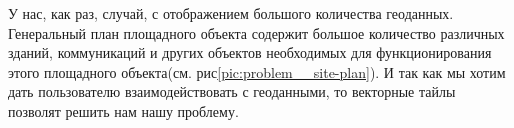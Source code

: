 \vskip 2mm
У нас, как раз, случай, с отображением большого количества геоданных.
Генеральный план площадного объекта содержит большое количество различных зданий, коммуникаций и других объектов
необходимых для функционирования этого площадного объекта(см. рис\ref{pic:problem__site-plan}). И так как мы хотим дать
пользователю взаимодействовать с геоданными, то векторные тайлы позволят решить нам нашу проблему.



